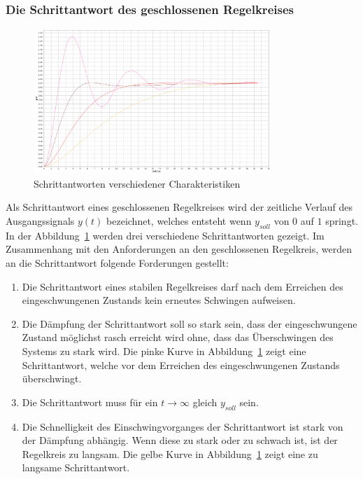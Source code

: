 \subsubsection*{Die Schrittantwort des geschlossenen Regelkreises}

\begin{figure}[h!, width=\pagewidth]
    \begin{center}
    \includegraphics[width=0.8\textwidth]{images/schrittantworten.png}
    \caption{Schrittantworten verschiedener Charakteristiken}
    \label{fig:stepresponse}
    \end{center}
\end{figure}

Als Schrittantwort eines geschlossenen Regelkreises wird der zeitliche Verlauf
des Ausgangssignals  $y(t)$ bezeichnet,  welches entsteht wenn  $y_{soll}$ von
$0$  auf  $1$  springt. In der  Abbildung~\ref{fig:stepresponse}  werden  drei
verschiedene Schrittantworten gezeigt.  Im  Zusammenhang mit den Anforderungen
an  den  geschlossenen  Regelkreis,  werden  an  die  Schrittantwort  folgende
Forderungen gestellt:

\begin{enumerate}
    \item
        Die Schrittantwort eines stabilen Regelkreises darf nach dem Erreichen
        des eingeschwungenen Zustands kein erneutes Schwingen aufweisen.
    \item
        Die  D\"ampfung  der  Schrittantwort  soll so  stark  sein,  dass  der
        eingeschwungene  Zustand m\"oglichst  rasch erreicht  wird ohne,  dass
        das  \"Uberschwingen des  Systems zu  stark wird. Die  pinke Kurve  in
        Abbildung~\ref{fig:stepresponse} zeigt eine Schrittantwort, welche vor
        dem Erreichen des eingeschwungenen Zustands \"uberschwingt.
    \item
        Die   Schrittantwort  muss   f\"ur  ein   $t\rightarrow\infty$  gleich
        $y_{soll}$ sein.
    \item
        Die  Schnelligkeit  des  Einschwingvorganges  der  Schrittantwort  ist
        stark  von  der  D\"ampfung   abh\"angig. Wenn  diese  zu  stark  oder
        zu   schwach   ist,  ist   der   Regelkreis   zu  langsam. Die   gelbe
        Kurve  in  Abbildung~\ref{fig:stepresponse}  zeigt  eine  zu  langsame
        Schrittantwort.
\end{enumerate}

